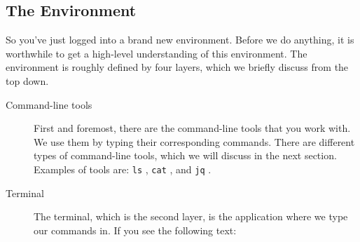 \documentclass[
]{book}
\newenvironment{Shaded}{\begin{snugshade}}{\end{snugshade}}
\newcommand{\ExtensionTok}[1]{#1}
\newcommand{\FunctionTok}[1]{\textcolor[rgb]{0.00,0.00,0.00}{#1}}
\newcommand{\NormalTok}[1]{#1}
\theoremstyle{definition}
\theoremstyle{definition}
\theoremstyle{definition}
\theoremstyle{remark}
\begin{document}
\hypertarget{the-environment}{%
\subsection{The Environment}\label{the-environment}}

So you've just logged into a brand new environment. Before we do anything, it is worthwhile to get a high-level understanding of this environment. The environment is roughly defined by four layers, which we briefly discuss from the top down.

\begin{description}
\item[Command-line tools]
First and foremost, there are the command-line tools that you work with. We use them by typing their corresponding commands. There are different types of command-line tools, which we will discuss in the next section. Examples of tools are: \texttt{ls} \citep{ls}, \texttt{cat} \citep{cat}, and \texttt{jq} \citep{jq}.
\item[Terminal]
The terminal, which is the second layer, is the application where we type our commands in. If you see the following text:

\begin{Shaded}
\end{Shaded}


\end{description}
\end{document}
